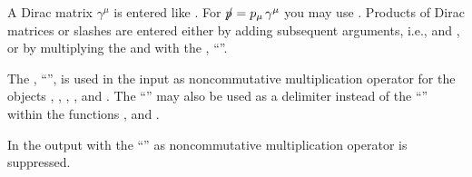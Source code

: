 A Dirac matrix $\gamma^{\mu}$ is entered like .
For  $p \hspace{-1.5mm} / = p_{\mu} \, \gamma^{\mu}$ you may use
. Products of Dirac matrices or slashes are
entered either by adding subsequent arguments, i.e.,
 and
, or by multiplying the
 and  with the \mma {}, ``''.


The \mma {}, ``'', is used in the input as noncommutative
multiplication operator for the objects ,
, , , 
and .
The ``'' may also be used as a delimiter instead of the ``\mb{,}''
within the functions ,  and
.

In the output with  the ``''
as noncommutative multiplication operator
is suppressed.

